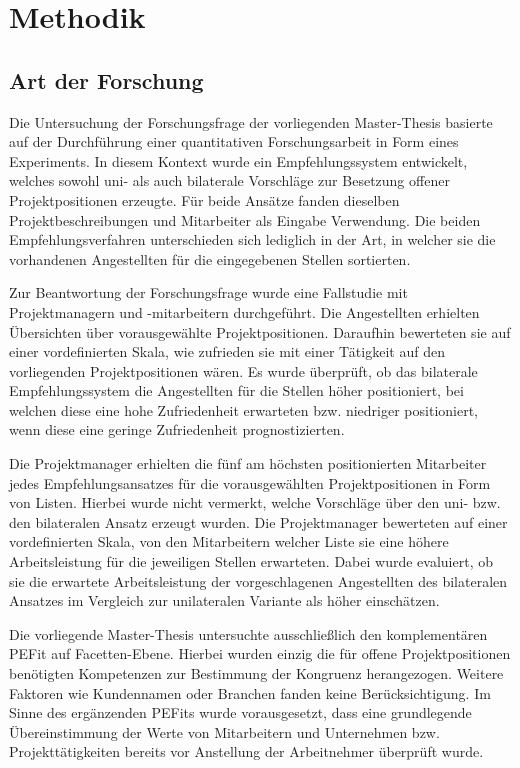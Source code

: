 \chapter{Methodik}
\label{ch:methodik}

\section{Art der Forschung}
\label{ch:methodik:art}
Die Untersuchung der Forschungsfrage der vorliegenden Master-Thesis basierte auf der Durchführung einer quantitativen Forschungsarbeit in Form eines Experiments. In diesem Kontext wurde ein Empfehlungssystem entwickelt, welches sowohl uni- als auch bilaterale Vorschläge zur Besetzung offener Projektpositionen erzeugte. Für beide Ansätze fanden dieselben Projektbeschreibungen und Mitarbeiter als Eingabe Verwendung. Die beiden Empfehlungsverfahren unterschieden sich lediglich in der Art, in welcher sie die vorhandenen Angestellten für die eingegebenen Stellen sortierten.

Zur Beantwortung der Forschungsfrage wurde eine Fallstudie mit Projektmanagern und -mitarbeitern durchgeführt. Die Angestellten erhielten Übersichten über vorausgewählte Projektpositionen. Daraufhin bewerteten sie auf einer vordefinierten Skala, wie zufrieden sie mit einer Tätigkeit auf den vorliegenden Projektpositionen wären. Es wurde überprüft, ob das bilaterale Empfehlungssystem die Angestellten für die Stellen höher positioniert, bei welchen diese eine hohe Zufriedenheit erwarteten bzw. niedriger positioniert, wenn diese eine geringe Zufriedenheit prognostizierten.

Die Projektmanager erhielten die fünf am höchsten positionierten Mitarbeiter jedes Empfehlungsansatzes für die vorausgewählten Projektpositionen in Form von Listen. Hierbei wurde nicht vermerkt, welche Vorschläge über den uni- bzw. den bilateralen Ansatz erzeugt wurden. Die Projektmanager bewerteten auf einer vordefinierten Skala, von den Mitarbeitern welcher Liste sie eine höhere Arbeitsleistung für die jeweiligen Stellen erwarteten. Dabei wurde evaluiert, ob sie die erwartete Arbeitsleistung der vorgeschlagenen Angestellten des bilateralen Ansatzes im Vergleich zur unilateralen Variante als höher einschätzen.

Die vorliegende Master-Thesis untersuchte ausschließlich den komplementären \ac{PEFit} auf Facetten-Ebene. Hierbei wurden einzig die für offene Projektpositionen benötigten Kompetenzen zur Bestimmung der Kongruenz herangezogen. Weitere Faktoren wie Kundennamen oder Branchen fanden keine Berücksichtigung. Im Sinne des ergänzenden \acp{PEFit} wurde vorausgesetzt, dass eine grundlegende Übereinstimmung der Werte von Mitarbeitern und Unternehmen bzw. Projekttätigkeiten bereits vor Anstellung der Arbeitnehmer überprüft wurde.

